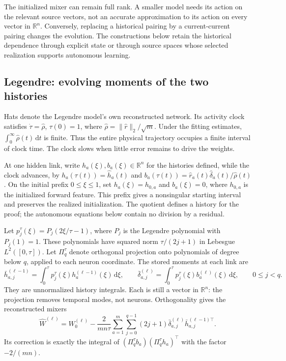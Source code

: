 The initialized mixer can remain full rank. A smaller model needs its action
on the relevant source vectors, not an accurate approximation to its action
on every vector in $\mathbb R^n$. Conversely, replacing a historical pairing
by a current-current pairing changes the evolution. The constructions below
retain the historical dependence through explicit state or through source
spaces whose selected realization supports autonomous learning.

\subsection{Legendre: evolving moments of the two histories}
\label{sec:legendre-method}

Hats denote the Legendre model's own reconstructed network. Its activity
clock satisfies $\dot\tau=\widehat\rho$, $\tau(0)=1$, where
$\widehat\rho=\|\widehat r\|_2/\sqrt m$. Under the fitting estimates,
$\int_0^\infty\widehat\rho(t)\,\mathrm dt$ is finite. Thus the entire
physical trajectory occupies a finite interval of clock time. The clock
slows when little error remains to drive the weights.

At one hidden link, write $h_a(\xi),b_a(\xi)\in\mathbb R^n$ for the
histories defined, while the clock advances, by
$h_a(\tau(t))=\widehat h_a(t)$ and
$b_a(\tau(t))=\widehat r_a(t)\widehat\delta_a(t)/\widehat\rho(t)$.
On the initial prefix $0\le\xi\le1$, set $h_a(\xi)=h_{0,a}$ and
$b_a(\xi)=0$, where $h_{0,a}$ is the initialized forward feature.
This prefix gives a nonsingular starting interval and preserves
the realized initialization. The quotient defines a history for the proof;
the autonomous equations below contain no division by a residual.

Let $p_j^\tau(\xi)=P_j(2\xi/\tau-1)$, where $P_j$ is the Legendre
polynomial with $P_j(1)=1$. These polynomials have squared norm
$\tau/(2j+1)$ in Lebesgue $L^2([0,\tau])$. Let $\Pi_q^\tau$ denote
orthogonal projection onto polynomials of degree below $q$, applied to each
neuron coordinate. The stored moments at each link are
\[
 \bar h_{a,j}^{(\ell-1)}=\int_0^\tau p_j^\tau(\xi)
 h_a^{(\ell-1)}(\xi)\,\mathrm d\xi,\qquad
 \bar\delta_{a,j}^{(\ell)}=\int_0^\tau p_j^\tau(\xi)
 b_a^{(\ell)}(\xi)\,\mathrm d\xi,\qquad 0\le j<q.
\]
They are unnormalized history integrals. Each is still a vector in
$\mathbb R^n$: the projection removes temporal modes, not neurons.
Orthogonality gives the reconstructed mixers
\begin{equation}
 \widehat W^{(\ell)}=W_0^{(\ell)}-
 \frac{2}{mn\tau}\sum_{a=1}^m\sum_{j=0}^{q-1}(2j+1)
 \bar\delta_{a,j}^{(\ell)}\bar h_{a,j}^{(\ell-1)\top}.
 \label{eq:methods-legendre-reconstruction}
\end{equation}
Its correction is exactly the integral of
$(\Pi_q^\tau b_a)(\Pi_q^\tau h_a)^\top$ with the factor $-2/(mn)$.

